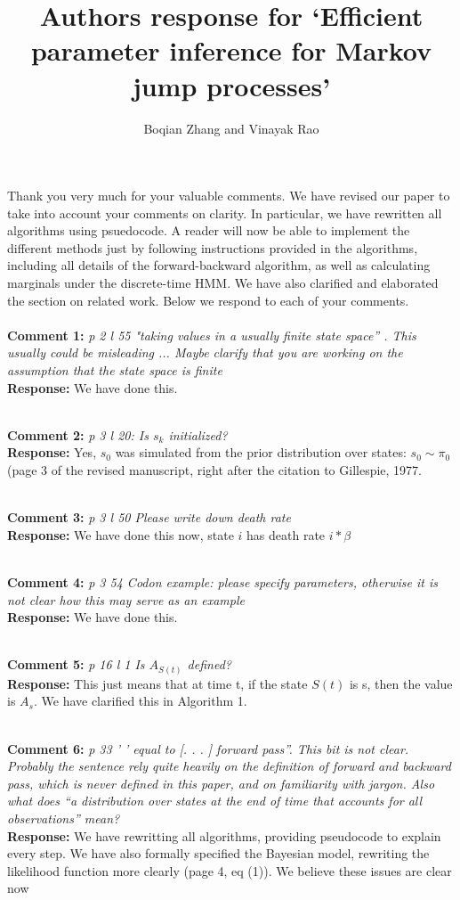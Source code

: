 \documentclass[11pt]{article}
\title{Authors response for `Efficient parameter inference for Markov jump processes'}
\author{Boqian Zhang and Vinayak Rao }
\date{}
\newcommand{\rev}[2]{\textbf{Comment #1: }\emph{#2}}
\newcommand{\resp}{\textbf{Response: }}
\begin{document}
\maketitle

Thank you very much for your valuable comments. We have revised our 
paper to take into account your comments on clarity. In particular, 
we have rewritten all algorithms using psuedocode. A reader will now 
be able to implement the different methods just by following instructions 
provided in the algorithms, including all details of the forward-backward 
algorithm, as well as calculating marginals under the discrete-time HMM. 
We have also clarified and elaborated the section on related work.
Below we respond to each of your comments.
~\\ 
~\\

\noindent \rev{1}{p 2 l 55 "taking values in a usually finite state space” . This usually could be misleading ... Maybe clarify that you are working on the assumption that the state space is finite}
\\
\resp We have done this.

~\\
\rev{2}{p 3 l 20: Is $s_k$ initialized?} \\
\resp Yes, $s_0$ was simulated from the prior distribution over states: $s_0 \sim \pi_0$ (page 3 of the revised manuscript, right after the citation to Gillespie, 1977. 

~\\
\rev{3}{p 3 l 50 Please write down death rate} \\ 
\resp  We have done this now, state $i$ has death rate $i*\beta$

~\\
\rev{4}{p 3 54 Codon example: please specify parameters, otherwise it is not clear how this may serve as an example} \\ 
\resp We have done this. 

~\\
\rev{5}{p 16 l 1 Is $A_{S(t)}$ defined?} \\
\resp{This just means that at time t, if the state $S(t)$ is s, then the value is $A_s$. We have clarified this in Algorithm 1.
}

~\\ 
\rev{6}{p 33 ’ ’ equal to [. . . ] forward pass”. This bit is not clear. Probably the sentence rely quite heavily on the definition of forward and backward pass, which is never defined in this paper, and on familiarity with jargon. Also what does “a distribution over states at
the end of time that accounts for all observations” mean?}\\ 
\resp We have rewritting all algorithms, providing pseudocode to explain every step. We have also formally specified the Bayesian model, rewriting the likelihood function more clearly (page 4, eq (1)). We believe these issues are clear now
\end{document}
